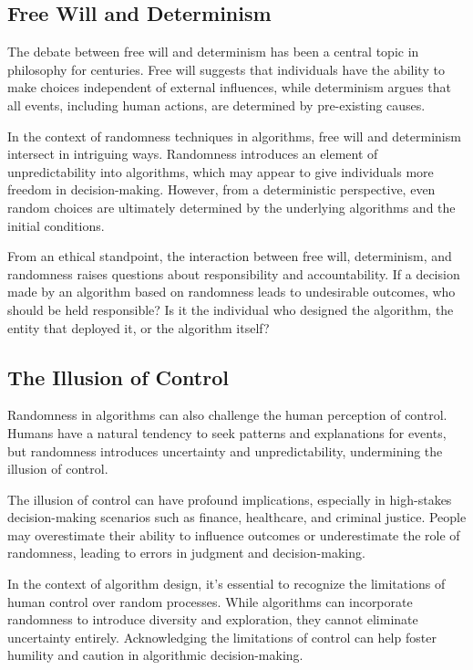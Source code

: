 \documentclass[12pt]{book} %
\begin{document}
\subsection{Free Will and Determinism}

The debate between free will and determinism has been a central topic in philosophy for centuries. Free will suggests that individuals have the ability to make choices independent of external influences, while determinism argues that all events, including human actions, are determined by pre-existing causes.

In the context of randomness techniques in algorithms, free will and determinism intersect in intriguing ways. Randomness introduces an element of unpredictability into algorithms, which may appear to give individuals more freedom in decision-making. However, from a deterministic perspective, even random choices are ultimately determined by the underlying algorithms and the initial conditions.

From an ethical standpoint, the interaction between free will, determinism, and randomness raises questions about responsibility and accountability. If a decision made by an algorithm based on randomness leads to undesirable outcomes, who should be held responsible? Is it the individual who designed the algorithm, the entity that deployed it, or the algorithm itself?

\subsection{The Illusion of Control}

Randomness in algorithms can also challenge the human perception of control. Humans have a natural tendency to seek patterns and explanations for events, but randomness introduces uncertainty and unpredictability, undermining the illusion of control.

The illusion of control can have profound implications, especially in high-stakes decision-making scenarios such as finance, healthcare, and criminal justice. People may overestimate their ability to influence outcomes or underestimate the role of randomness, leading to errors in judgment and decision-making.

In the context of algorithm design, it's essential to recognize the limitations of human control over random processes. While algorithms can incorporate randomness to introduce diversity and exploration, they cannot eliminate uncertainty entirely. Acknowledging the limitations of control can help foster humility and caution in algorithmic decision-making.
\end{document}
